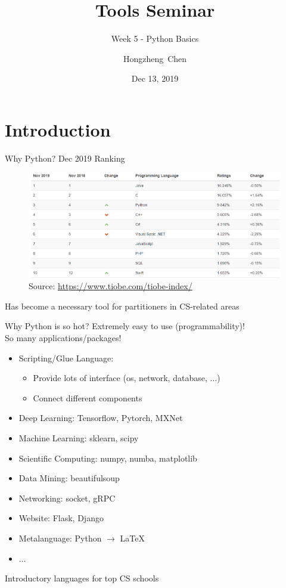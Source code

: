 \documentclass{../TexTemplate/myslide}
\title[ToolsSeminar]{Tools Seminar}
\subtitle{Week 5 - Python Basics}
\author[chhzh123]{Hongzheng~Chen}
\date[Dec 13, 2019]{Dec 13, 2019}
\begin{document}
\begin{frame}
\titlepage
\end{frame}

\begin{frame}
\tableofcontents
\end{frame}

\section{Introduction}
\begin{frame}{Why Python?}
Dec 2019 Ranking
\begin{figure}
\centering
\includegraphics[width=\linewidth]{../Week03-CppToolchain/fig/TIOBE.png}
\caption*{\scriptsize Source: \url{https://www.tiobe.com/tiobe-index/}}
\end{figure}
Has become a necessary tool for partitioners in CS-related areas
\end{frame}

\begin{frame}{Why Python is so hot?}
Extremely easy to use (programmability)!\\
So many applications/packages!
\begin{itemize}
	\item Scripting/Glue Language:
	\begin{itemize}
		\item Provide lots of interface (os, network, database, $\ldots$)
		\item Connect different components
	\end{itemize}
	\item Deep Learning: Tensorflow, Pytorch, MXNet
	\item Machine Learning: sklearn, scipy
	\item Scientific Computing: numpy, numba, matplotlib
	\item Data Mining: beautifulsoup
	\item Networking: socket, gRPC
	\item Website: Flask, Django
	\item Metalanguage: Python $\to$ \LaTeX
	\item $\ldots$
\end{itemize}
Introductory languages for top CS schools
\end{frame}
\end{document}
